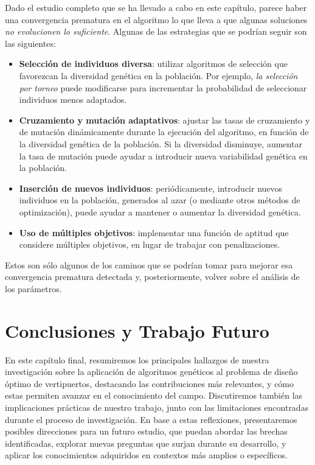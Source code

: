 \documentclass[12pt,a4paper]{book}
\begin{document}
Dado el estudio completo que se ha llevado a cabo en este capítulo, parece haber una convergencia prematura en el algoritmo lo que lleva a que algunas soluciones \textsl{no evolucionen lo suficiente}. Algunas de las estrategias que se podrían seguir son las siguientes: 

\begin{itemize}
	\item \textbf{Selección de individuos diversa}: utilizar algoritmos de selección que favorezcan la diversidad genética en la población. Por ejemplo, \textsl{la selección por torneo} puede modificarse para incrementar la probabilidad de seleccionar individuos menos adaptados.

    \item \textbf{Cruzamiento y mutación adaptativos}: ajustar las tasas de cruzamiento y de mutación dinámicamente durante la ejecución del algoritmo, en función de la diversidad genética de la población. Si la diversidad disminuye, aumentar la tasa de mutación puede ayudar a introducir nueva variabilidad genética en la población.

    \item\textbf{Inserción de nuevos individuos}: periódicamente, introducir nuevos individuos en la población, generados al azar (o mediante otros métodos de optimización), puede ayudar a mantener o aumentar la diversidad genética.

    \item \textbf{Uso de múltiples objetivos}: implementar una función de aptitud que considere múltiples objetivos, en lugar de trabajar con penalizaciones.
\end{itemize}

Estos son sólo algunos de los caminos que se podrían tomar para mejorar esa convergencia prematura detectada y, posteriormente, volver sobre el análisis de los parámetros. 


\chapter{Conclusiones y Trabajo Futuro} \label{Capítulo 6}
En este capítulo final, resumiremos los principales hallazgos de nuestra investigación sobre la aplicación de algoritmos genéticos al problema de diseño óptimo de vertipuertos, destacando las contribuciones más relevantes, y cómo estas permiten avanzar en el conocimiento del campo. Discutiremos también las implicaciones prácticas de nuestro trabajo, junto con las limitaciones encontradas durante el proceso de investigación. En base a estas reflexiones, presentaremos posibles direcciones para un futuro estudio, que puedan abordar las brechas identificadas, explorar nuevas preguntas que surjan durante su desarrollo, y aplicar los conocimientos adquiridos en contextos más amplios o específicos.
\end{document}
